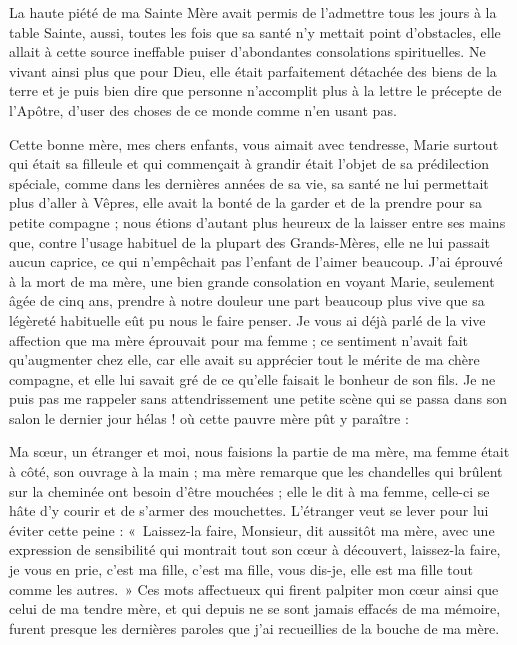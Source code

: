 \documentclass[11pt,a4paper]{report}
\begin{document}
La haute piété de ma Sainte Mère avait permis de l'admettre tous les jours à la table Sainte, aussi, toutes les fois que sa santé n'y mettait point d'obstacles, elle allait à cette source ineffable puiser d'abondantes consolations spirituelles. Ne vivant ainsi plus que pour Dieu, elle était parfaitement détachée des biens de la terre et je puis bien dire que personne n'accomplit plus à la lettre le précepte de l'Apôtre, d'user des choses de ce monde comme n'en usant pas.

Cette bonne mère, mes chers enfants, vous aimait avec tendresse, Marie surtout qui était sa filleule et qui commençait à grandir était l'objet de sa prédilection spéciale, comme dans les dernières années de sa vie, sa santé ne lui permettait plus d'aller à Vêpres, elle avait la bonté de la garder et de la prendre pour sa petite compagne ; nous étions d'autant plus heureux de la laisser entre ses mains que, contre l'usage habituel de la plupart des Grands-Mères, elle ne lui passait aucun caprice, ce qui n'empêchait pas l'enfant de l'aimer beaucoup. J'ai éprouvé à la mort de ma mère, une bien grande consolation en voyant Marie, seulement âgée de cinq ans, prendre à notre douleur une part beaucoup plus vive que sa légèreté habituelle eût pu nous le faire penser. Je vous ai déjà parlé de la vive affection que ma mère éprouvait pour ma femme ; ce sentiment n'avait fait qu'augmenter chez elle, car elle avait su apprécier tout le mérite de ma chère compagne, et elle lui savait gré de ce qu'elle faisait le bonheur de son fils. Je ne puis pas me rappeler sans attendrissement une petite scène qui se passa dans son salon le dernier jour hélas ! où cette pauvre mère pût y paraître :

Ma sœur, un étranger et moi, nous faisions la partie de ma mère, ma femme était à côté, son ouvrage à la main ; ma mère remarque que les chandelles qui brûlent sur la cheminée ont besoin d'être mouchées ; elle le dit à ma femme, celle-ci se hâte d'y courir et de s'armer des mouchettes. L'étranger veut se lever pour lui éviter cette peine : «~Laissez-la faire, Monsieur, dit aussitôt ma mère, avec une expression de sensibilité qui montrait tout son cœur à découvert, laissez-la faire, je vous en prie, c'est ma fille, c'est ma fille, vous dis-je, elle est ma fille tout comme les autres.~» Ces mots affectueux qui firent palpiter mon cœur ainsi que celui de ma tendre mère, et qui depuis ne se sont jamais effacés de ma mémoire, furent presque les dernières paroles que j'ai recueillies de la bouche de ma mère.
\end{document}
